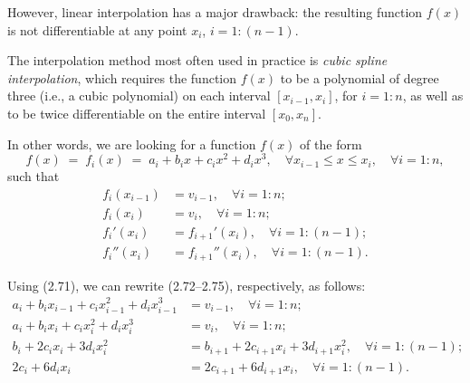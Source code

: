 However, linear interpolation has a major drawback: the resulting function $f(x)$
is not differentiable at any point $x_i$, $i=1:(n-1)$.

The interpolation method most often used in practice is \textit{cubic spline
interpolation}, which requires the function $f(x)$ to be a polynomial of degree
three (i.e., a cubic polynomial) on each interval $[x_{i-1},x_i]$, for $i=1:n$, as
well as to be twice differentiable on the entire interval $[x_0,x_n]$.

In other words, we are looking for a function $f(x)$ of the form
\begin{equation}
f(x) \;=\; f_i(x) \;=\; a_i+b_ix+c_ix^2+d_ix^3, \quad \forall x_{i-1}\le x\le x_i,
\quad \forall i=1:n,
\end{equation}
such that
\begin{align}
f_i(x_{i-1}) &= v_{i-1}, \quad \forall i=1:n; \\
f_i(x_i) &= v_i, \quad \forall i=1:n; \\
f_i'(x_i) &= f_{i+1}'(x_i), \quad \forall i=1:(n-1); \\
f_i''(x_i) &= f_{i+1}''(x_i), \quad \forall i=1:(n-1).
\end{align}

Using (2.71), we can rewrite (2.72--2.75), respectively, as follows:
\begin{align}
a_i+b_ix_{i-1}+c_ix_{i-1}^2+d_ix_{i-1}^3 &= v_{i-1}, \quad \forall i=1:n; \\
a_i+b_ix_i+c_ix_i^2+d_ix_i^3 &= v_i, \quad \forall i=1:n; \\
b_i+2c_ix_i+3d_ix_i^2 &= b_{i+1}+2c_{i+1}x_i+3d_{i+1}x_i^2, \quad \forall
i=1:(n-1); \\
2c_i+6d_ix_i &= 2c_{i+1}+6d_{i+1}x_i, \quad \forall i=1:(n-1).
\end{align}
